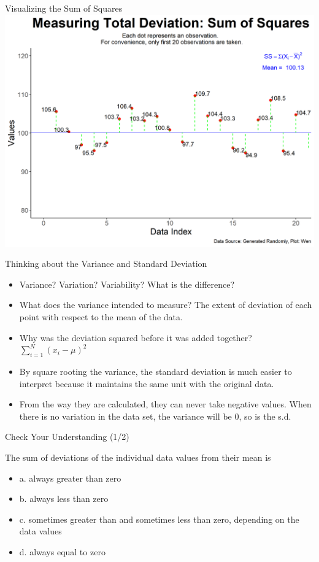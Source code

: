 \documentclass{beamer}
\begin{document}
\begin{frame}{Visualizing the Sum of Squares}
\includegraphics[scale=0.5]{images/uniScatterPlotAnnotated.png}
\end{frame}


\begin{frame}{Thinking about the Variance and Standard Deviation}

\begin{itemize}

\item Variance? Variation? Variability? What is the difference? 

\item What does the variance intended to measure? The extent of deviation of each point with respect to the mean of the data.

\item Why was the deviation squared before it was added together? $  \sum_{i=1}^N(x_i - \mu)^2 $ 

\item By square rooting the variance, the standard deviation is much easier to interpret because it maintains the same unit with the original data.

\item From the way they are calculated, they can never take negative values. When there is no variation in the data set, the variance will be 0, so is the s.d. 

\end{itemize}
\end{frame}


\begin{frame}{Check Your Understanding (1/2)}

The sum of deviations of the individual data values from their mean is
\begin{itemize}
\item a. always greater than zero
\item b. always less than zero
\item c. sometimes greater than and sometimes less than zero, depending on the data values
\item d. always equal to zero
\end{itemize}
\end{frame}
\end{document}
